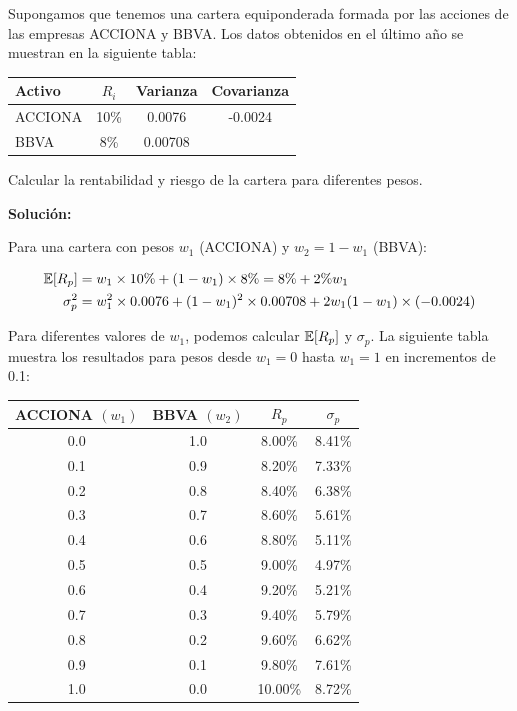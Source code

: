 \begin{ejemplo}
Supongamos que tenemos una cartera equiponderada formada por las acciones de las empresas ACCIONA y BBVA. Los datos obtenidos en el último año se muestran en la siguiente tabla:

\begin{center}
\begin{tabular}{lccc}
\toprule
Activo & $R_i$ & Varianza & Covarianza \\
\midrule
ACCIONA & 10\% & 0.0076 & -0.0024 \\
BBVA & 8\% & 0.00708 & \\
\bottomrule
\end{tabular}
\end{center}

Calcular la rentabilidad y riesgo de la cartera para diferentes pesos.

\textbf{Solución:}

Para una cartera con pesos $w_1$ (ACCIONA) y $w_2 = 1-w_1$ (BBVA):

\begin{align*}
\mathbb{E}[R_p] &= w_1 \times 10\% + (1-w_1) \times 8\% = 8\% + 2\% w_1\\
\sigma_p^2 &= w_1^2 \times 0.0076 + (1-w_1)^2 \times 0.00708 + 2w_1(1-w_1) \times (-0.0024)
\end{align*}

Para diferentes valores de $w_1$, podemos calcular $\mathbb{E}[R_p]$ y $\sigma_p$. La siguiente tabla muestra los resultados para pesos desde $w_1 = 0$ hasta $w_1 = 1$ en incrementos de 0.1:

\begin{center}
\begin{tabular}{cccc}
\toprule
ACCIONA $(w_1)$ & BBVA $(w_2)$ & $R_p$ & $\sigma_p$ \\
\midrule
0.0 & 1.0 & 8.00\% & 8.41\% \\
0.1 & 0.9 & 8.20\% & 7.33\% \\
0.2 & 0.8 & 8.40\% & 6.38\% \\
0.3 & 0.7 & 8.60\% & 5.61\% \\
0.4 & 0.6 & 8.80\% & 5.11\% \\
0.5 & 0.5 & 9.00\% & 4.97\% \\
0.6 & 0.4 & 9.20\% & 5.21\% \\
0.7 & 0.3 & 9.40\% & 5.79\% \\
0.8 & 0.2 & 9.60\% & 6.62\% \\
0.9 & 0.1 & 9.80\% & 7.61\% \\
1.0 & 0.0 & 10.00\% & 8.72\% \\
\bottomrule
\end{tabular}
\end{center}


\end{ejemplo}
